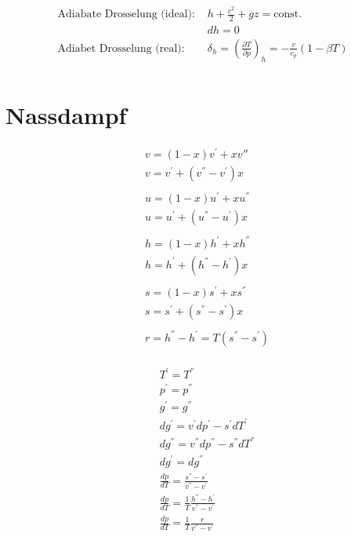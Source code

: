 \documentclass[twocolumn]{article}
\begin{document}
\begin{align*}
	\text{Adiabate Drosselung (ideal): } &h + \frac{c^2}{2} + gz = \text{const.} \\
	&dh = 0 \\
	\text{Adiabet Drosselung (real): } &\delta_h = \left(\frac{\partial T}{\partial p}\right)_{h}  = - \frac{v}{c_p}(1-\beta T) \\
\end{align*}
\pagebreak
\section{Nassdampf}

\begin{multicols}{2}

\begin{align*}
	& v = (1-x)v^{'} + xv{''} \\
	& v = v^{'} + (v^{''}-v^{'})x \\ \\
	& u = (1-x) u^{'} + xu^{''} \\
	& u = u^{'} + (u^{''}-u^{'})x \\ \\
	& h = (1-x) h^{'} + xh^{''} \\
	& h = h^{'} + (h^{''}-h^{'})x \\ \\
	& s = (1-x) s^{'} + xs^{''} \\
	& s = s^{'} + (s^{''}-s^{'})x \\ \\
	& r = h^{''} - h^{'} = T(s^{''}-s^{'}) \\
\end{align*}

\begin{align*}
	& T^{'} = T^{''} \\
	& p^{'} = p^{''} \\
	& g^{'} = g^{''} \\
	&dg^{'} = v^{'}dp^{'} - s^{'}dT^{'} \\
	&dg^{''} = v^{''} dp^{''} - s^{''} dT^{''} \\
	&dg^{'} = dg^{''} \\
	& \frac{dp}{dT} = \frac{s^{''} - s^{'}}{v^{''} - v^{'}} \\
	& \frac{dp}{dT} = \frac{1}{T}\frac{h^{''} - h^{'}}{v^{''} - v^{'}} \\
	& \frac{dp}{dT} = \frac{1}{T}\frac{r}{v^{''} -v^{'}} \\
\end{align*}
\end{multicols}
\end{document}

